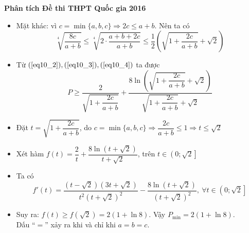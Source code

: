 \documentclass[handout]{beamer} %
\newcommand\FontviTen{\fontsize{8.5}{7.2}\selectfont}
\begin{document}
			\begin{frame}{\textbf{\qquad Phân tích Đề thi THPT Quốc gia 2016}}
				\FontviTen
				\begin{itemize}
					\item Mặt khác: vì $c=\min\{a,b,c\}\Rightarrow 2c\leq a+b$. Nên ta có
					\begin{equation}\label{eq10_4}
						\sqrt[4]{\frac{8c}{a+b}}\leq \sqrt[4]{2\cdot\frac{a+b+2c}{a+b}}\leq\frac{1}{2} \left(\sqrt{1+\frac{2c}{a+b}}+\sqrt{2}\right)
					\end{equation}
					\item Từ $(\ref{eq10_2}), (\ref{eq10_3}), (\ref{eq10_4})$ ta được\\[-15pt]
					$$P\geq \frac{2}{\sqrt{1+\dfrac{2c}{a+b}}}+\frac{8\ln\left( \sqrt{1+\dfrac{2c}{a+b}}+\sqrt{2}\right)}{\sqrt{1+\dfrac{2c}{a+b}}+\sqrt{2}}$$
					\item Đặt $t=\sqrt{1+\dfrac{2c}{a+b}}$, do $c=\min\{a,b,c\}\Rightarrow \dfrac{2c}{a+b}\leq 1\Rightarrow t\leq \sqrt{2}$\\[10pt]
					\item Xét hàm $f(t)=\dfrac{2}{t}+\dfrac{8\ln\left(t+\sqrt{2}\right)}{t+\sqrt{2}}$, trên $t\in\left(0;\sqrt{2}\right]$\\[10pt]
					\item Ta có
					$$f'(t)=
					\frac{\left(t-\sqrt{2}\right)\left(3t+\sqrt{2}\right)}{t^2\left(t+\sqrt{2}\right)^2}-\frac{8\ln\left(t+ \sqrt{2}\right)}{\left(t+\sqrt{2}\right)^2},~\forall t\in\left(0;\sqrt{2}\right] 
					$$
					\item Suy ra: $f(t)\geq f(\sqrt{2})=2\left(1+\ln 8\right)$. Vậy $P_{\min} =2\left(1+\ln 8\right)$.\\[8pt]
					Dấu ``$=$'' xảy ra khi và chỉ khi $a=b=c$.
				\end{itemize}
			\end{frame}
\end{document}
